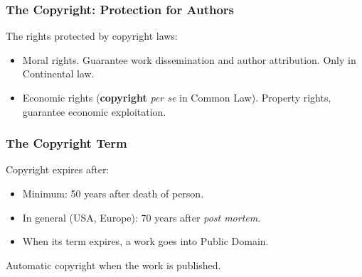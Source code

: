 
%
%
%


\begin{frame}
\frametitle{The Copyright: Protection for Authors}

The rights protected by copyright laws:
\begin{itemize}
\item \alert{Moral rights}. Guarantee work dissemination and author attribution.
Only in Continental law.
\item \alert{Economic rights} (\textbf{copyright} \textit{per se} in Common Law). Property rights, guarantee economic exploitation.
\end{itemize}


\end{frame}


\begin{frame}
\frametitle{The Copyright Term}

Copyright expires after:

\begin{itemize}
\item Minimum: 50 years after death of person. 
\item In general (USA, Europe): 70 years after \textit{post mortem}.
\item When its term expires, a work goes into Public Domain.
\end{itemize}
\pause
\begin{center}
Automatic copyright when the work is published.
\end{center}

\end{frame}


